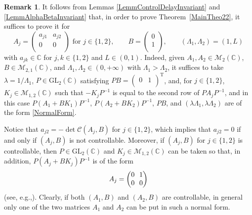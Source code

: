\documentclass[10pt]{amsart}
\providecommand{\eg}{}
\renewcommand{\eg}{e.g.,\xspace}
\theoremstyle{plain}
\theoremstyle{definition}
\newtheorem{remk}[theo]{Remark}
\newcommand{\transp}{{\scriptscriptstyle\mathrm{T}}}
\begin{document}
\begin{remk}
\label{RemkReduction}
It follows from Lemmas \ref{LemmControlDelayInvariant} and \ref{LemmAlphaBetaInvariant} that, in order to prove Theorem~\ref{MainTheo22}, it suffices to prove it for
\begin{equation}
\label{NormalForm}
A_j = \begin{pmatrix}
a_{j1} & a_{j2} \\
0 & 0 \\
\end{pmatrix} \text{ for } j \in \{1, 2\}, \qquad B = \begin{pmatrix}
0 \\
1 \\
\end{pmatrix}, \qquad (\Lambda_1, \Lambda_2) = (1, L)
\end{equation}
with $a_{jk} \in \mathbb C$ for $j, k \in \{1, 2\}$ and $L \in (0, 1)$. Indeed, given $A_1, A_2 \in \mathcal M_2(\mathbb C)$, $B \in \mathcal M_{2, 1}(\mathbb C)$, and $\Lambda_1, \Lambda_2 \in (0, +\infty)$ with $\Lambda_1 > \Lambda_2$, it suffices to take $\lambda = 1/\Lambda_1$, $P \in \mathrm{GL}_2(\mathbb C)$ satisfying $P B = \begin{pmatrix}0 & 1 \\\end{pmatrix}^\transp$, and, for $j \in \{1, 2\}$, $K_j \in \mathcal M_ {1, 2}(\mathbb C)$ such that $-K_j P^{-1}$ is equal to the second row of $P A_j P^{-1}$, and in this case $P(A_1 + B K_1)P^{-1}$, \hbox{$P(A_2 + B K_2)P^{-1}$}, $P B$, and $(\lambda \Lambda_1, \lambda \Lambda_2)$ are of the form \eqref{NormalForm}.

Notice that $a_{j2} = -\det\mathcal C(A_j, B)$ for $j \in \{1, 2\}$, which implies that $a_{j2} =0$ if and only if $(A_j,B)$ is not controllable.
Moreover, if $(A_j,B)$ for $j\in\{1,2\}$ is controllable, then $P \in \mathrm{GL}_2(\mathbb C)$ and $K_j \in \mathcal M_{1, 2}(\mathbb C)$ can be taken so that, in addition,
\hbox{$P (A_j + B K_j) P^{-1}$} is of the form
\begin{equation*}\arraycolsep3.5pt
A_j = \begin{pmatrix}
0 & 1 \\
0 & 0 \\
\end{pmatrix} \end{equation*}
(see, \eg \cite[Def.\,5.1.5]{Sontag1998Mathematical}). Clearly, if both $(A_1,B)$ and $(A_2,B)$ are controllable, in general only one of the two matrices $A_1$ and $A_2$ can be put in such a normal form.


\end{remk}
\end{document}
